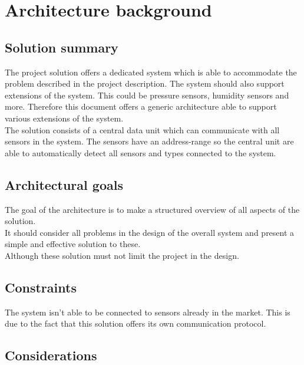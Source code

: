 \chapter{Architecture background}

\section{Solution summary}
The project solution offers a dedicated system which is able to accommodate the problem described in the project description. The system should also support extensions of the system. This could be pressure sensors, humidity sensors and more. Therefore this document offers a generic architecture able to support various extensions of the system.\\
The solution consists of a central data unit which can communicate with all sensors in the system. The sensors have an address-range so the central unit are able to automatically detect all sensors and types connected to the system. 

\section{Architectural goals}
The goal of the architecture is to make a structured overview of all aspects of the solution.\\
It should consider all problems in the design of the overall system and present a simple and effective solution to these.\\
Although these solution must not limit the project in the design.\\

\section{Constraints}
The system isn't able to be connected to sensors already in the market. This is due to the fact that this solution offers its own communication protocol.\\

\section{Considerations}

